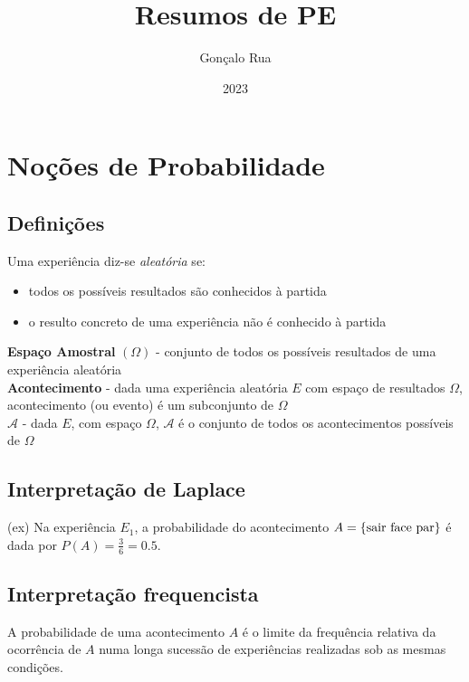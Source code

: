\documentclass{article}
\title{Resumos de PE}
\author{Gonçalo Rua}
\date{2023}
\begin{document}
\maketitle

\section{Noções de Probabilidade}

\subsection{Definições}

Uma experiência diz-se \emph{aleatória} se:

\begin{itemize}
    \item todos os possíveis resultados são conhecidos à partida
    \item o resulto concreto de uma experiência não é conhecido à partida
\end{itemize}

\noindent \textbf{Espaço Amostral} $(\Omega)$ - conjunto de todos os possíveis resultados de uma experiência aleatória \\

\noindent \textbf{Acontecimento} - dada uma experiência aleatória $E$ com espaço de resultados $\Omega$, acontecimento (ou evento) é um subconjunto de $\Omega$ \\

\noindent \textbf{$\mathcal{A}$} - dada $E$, com espaço $\Omega$, $\mathcal{A}$ é o conjunto de todos os acontecimentos possíveis de $\Omega$

\subsection{Interpretação de Laplace}

(ex) Na experiência $E_1$, a probabilidade do acontecimento $A = \{\textnormal{sair face par}\}$ é dada por $P(A) = \frac{3}{6} = 0.5$.

\subsection{Interpretação frequencista}

A probabilidade de uma acontecimento $A$ é o limite da frequência relativa da ocorrência de $A$ numa longa sucessão de experiências realizadas sob as mesmas condições.
\end{document}
